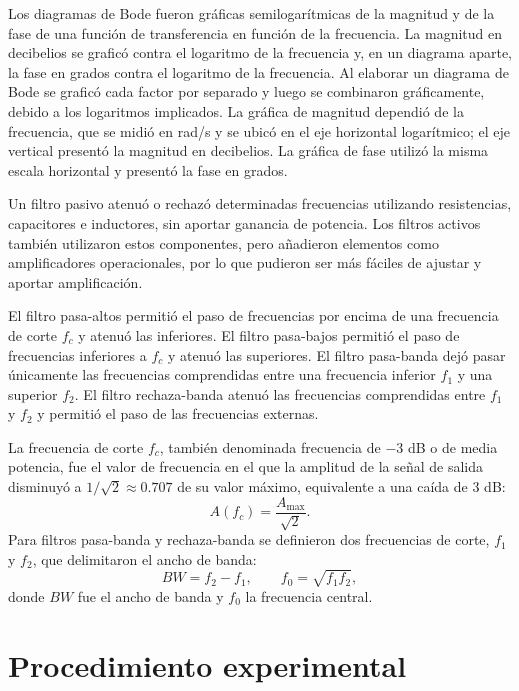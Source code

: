 \documentclass[12pt,a4paper]{article}
\begin{document}
Los diagramas de Bode fueron gráficas semilogarítmicas de la magnitud y de la fase de una función de transferencia en función de la frecuencia. La magnitud en decibelios se graficó contra el logaritmo de la frecuencia y, en un diagrama aparte, la fase en grados contra el logaritmo de la frecuencia. Al elaborar un diagrama de Bode se graficó cada factor por separado y luego se combinaron gráficamente, debido a los logaritmos implicados. La gráfica de magnitud dependió de la frecuencia, que se midió en rad/s y se ubicó en el eje horizontal logarítmico; el eje vertical presentó la magnitud en decibelios. La gráfica de fase utilizó la misma escala horizontal y presentó la fase en grados.

Un filtro pasivo atenuó o rechazó determinadas frecuencias utilizando resistencias, capacitores e inductores, sin aportar ganancia de potencia. Los filtros activos también utilizaron estos componentes, pero añadieron elementos como amplificadores operacionales, por lo que pudieron ser más fáciles de ajustar y aportar amplificación.

El filtro pasa-altos permitió el paso de frecuencias por encima de una frecuencia de corte \(f_c\) y atenuó las inferiores. El filtro pasa-bajos permitió el paso de frecuencias inferiores a \(f_c\) y atenuó las superiores. El filtro pasa-banda dejó pasar únicamente las frecuencias comprendidas entre una frecuencia inferior \(f_1\) y una superior \(f_2\). El filtro rechaza-banda atenuó las frecuencias comprendidas entre \(f_1\) y \(f_2\) y permitió el paso de las frecuencias externas.

La frecuencia de corte \(f_c\), también denominada frecuencia de \(-3\) dB o de media potencia, fue el valor de frecuencia en el que la amplitud de la señal de salida disminuyó a \(1/\sqrt{2}\approx0.707\) de su valor máximo, equivalente a una caída de 3 dB:\@
\begin{equation}
    A(f_c)=\frac{A_{\max}}{\sqrt{2}}.
    \label{eq:fc}
\end{equation}
Para filtros pasa-banda y rechaza-banda se definieron dos frecuencias de corte, \(f_1\) y \(f_2\), que delimitaron el ancho de banda:
\begin{equation}
    BW=f_2-f_1,\qquad f_0=\sqrt{f_1f_2},
    \label{eq:ancho}
\end{equation}
donde \(BW\) fue el ancho de banda y \(f_0\) la frecuencia central.

\section{Procedimiento experimental}
\end{document}
